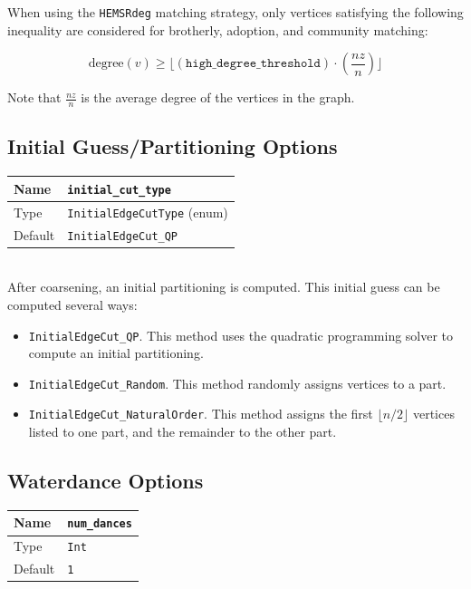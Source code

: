 \documentclass[letter]{article}
\begin{document}
When using the \texttt{HEMSRdeg} matching strategy, only vertices satisfying the following inequality are considered for brotherly, adoption, and community matching:

\[
\text{degree}(v) \geq \lfloor(\texttt{high\_degree\_threshold}) \cdot \left(\frac{nz}{n}\right)\rfloor
\]

Note that $\frac{nz}{n}$ is the average degree of the vertices in the graph.

\subsection{Initial Guess/Partitioning Options}

\begin{tabular}{|l|l|} \hline
Name & \texttt{initial\_cut\_type} \\ \hline
Type & \texttt{InitialEdgeCutType} (enum) \\ \hline
Default & \texttt{InitialEdgeCut\_QP} \\ \hline
\end{tabular}\\

After coarsening, an initial partitioning is computed. This initial guess can be computed several ways:

\begin{itemize}
\item \texttt{InitialEdgeCut\_QP}. This method uses the quadratic programming solver to compute an initial partitioning.
\item \texttt{InitialEdgeCut\_Random}. This method randomly assigns vertices to a part.
\item \texttt{InitialEdgeCut\_NaturalOrder}. This method assigns the first $\lfloor n/2 \rfloor$ vertices listed to one part, and the remainder to the other part.
\end{itemize}

\subsection{Waterdance Options}
\begin{tabular}{|l|l|} \hline
Name & \texttt{num\_dances} \\ \hline
Type & \texttt{Int} \\ \hline
Default & \texttt{1} \\ \hline
\end{tabular}\\
                      
\end{document}
